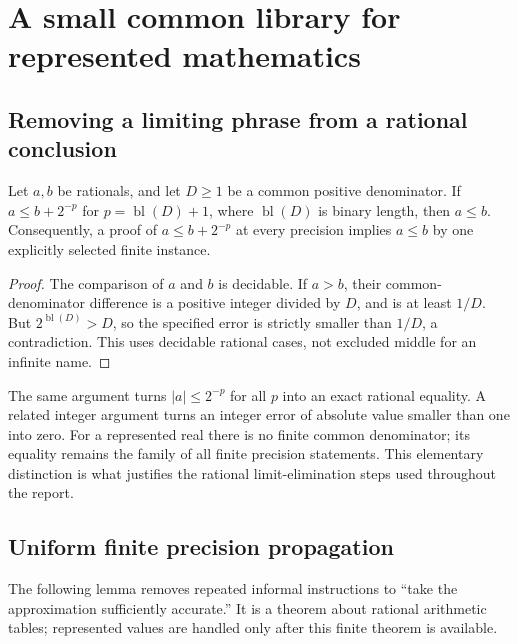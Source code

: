 \section{A small common library for represented mathematics}
\label{sec:analytic-tools}

\subsection{Removing a limiting phrase from a rational conclusion}

\begin{lemma}\label{lem:rational-separation}
Let \(a,b\) be rationals, and let \(D\ge1\) be a common positive
denominator.  If \(a\le b+2^{-p}\) for
\(p=\operatorname{bl}(D)+1\), where \(\operatorname{bl}(D)\) is binary length,
then \(a\le b\).
Consequently, a proof of \(a\le b+2^{-p}\) at every precision implies
\(a\le b\) by one explicitly selected finite instance.
\end{lemma}

\begin{proof}
The comparison of \(a\) and \(b\) is decidable.  If \(a>b\), their
common-denominator difference is a positive integer divided by \(D\),
and is at least \(1/D\).  But \(2^{\operatorname{bl}(D)}>D\), so the specified error is
strictly smaller than \(1/D\), a contradiction.  This uses decidable
rational cases, not excluded middle for an infinite name.
\end{proof}

The same argument turns \(|a|\le2^{-p}\) for all \(p\) into an exact
rational equality.  A related integer argument turns an integer error
of absolute value smaller than one into zero.  For a represented real
there is no finite common denominator; its equality remains the family
of all finite precision statements.  This elementary distinction is what
justifies the rational limit-elimination steps used throughout the report.

\subsection{Uniform finite precision propagation}

The following lemma removes repeated informal instructions to
``take the approximation sufficiently accurate.''  It is a theorem about
rational arithmetic tables; represented values are handled only after
this finite theorem is available.

